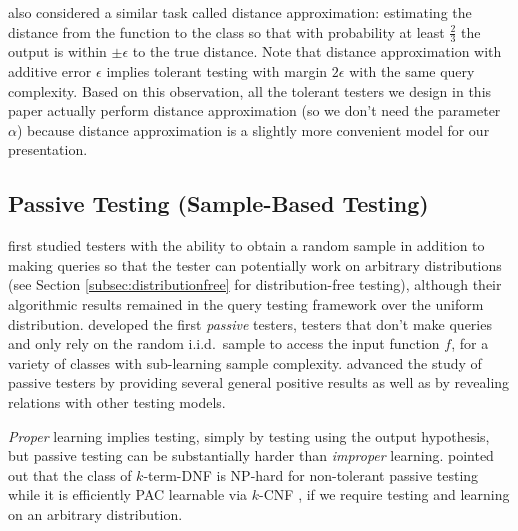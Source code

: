 \citet{PRR06} also considered a similar task called distance approximation: estimating the distance from the function to the class so that with probability at least $\frac 23$ the output is within $\pm\epsilon$ to the true distance. Note that distance approximation with additive error $\epsilon$ implies tolerant testing with margin $2\epsilon$ with the same query complexity. Based on this observation, all the tolerant testers we design in this paper actually perform distance approximation (so we don't need the parameter $\alpha$) because distance approximation is a slightly more convenient model for our presentation.
\subsection{Passive Testing (Sample-Based Testing)}
\label{subsec:passive}
\citet{GGR98} first studied testers with the ability to obtain a random sample in addition to making queries so that the tester can potentially work on arbitrary distributions (see Section \ref{subsec:distributionfree} for distribution-free testing), although their algorithmic results remained in the query testing framework over the uniform distribution.
\citet{KR98} developed the first \emph{passive} testers, testers that don't make queries and only rely on the random i.i.d.\ sample to access the input function $f$, for a variety of classes with sub-learning sample complexity. \citet{GR13} advanced the study of passive testers by providing several general positive results as well as by revealing relations with other testing models.

\emph{Proper} learning implies testing, simply by testing using the output hypothesis, but passive testing can be substantially harder than \emph{improper} learning. \citet{GGR98} pointed out that the class of $k$-term-DNF is NP-hard for non-tolerant passive testing while it is efficiently PAC learnable via $k$-CNF \citep{PV88}, if we require testing and learning on an arbitrary distribution.

